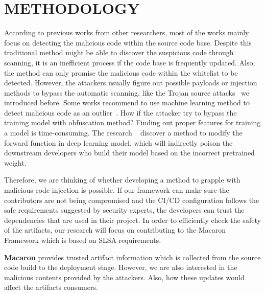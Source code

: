 \section{METHODOLOGY}
According to previous works from other researchers, most of the works mainly focus on detecting the malicious
code within the source code base. Despite this traditional method might be able to discover the suspicious 
code through scanning, it is an inefficient process if the code base is frequently updated. Also, the method 
can only promise the malicious code within the whitelist to be detected. However, the attackers usually 
figure out possible payloads or injection methods to bypass the automatic scanning, like the Trojan source 
attacks~\cite{boucher2023trojan} we introduced before. 
Some works recommend to use machine learning method to detect malicious code as an outlier~\cite{garrett2019detecting}.
How if the attacker try to bypass the training model with obfuscation method? Finding out proper features for
training a model is time-consuming. The research ~\cite{zheng2023careful} discover a method to modify
the forward function in deep learning model, which will indirectly poison the downstream developers who build 
their model based on the incorrect pretrained weight. 

Therefore, we are thinking of whether developing a method to grapple with malicious code injection is possible.
If our framework can make sure the contributors are not being compromised and the CI/CD configuration follows
the safe requirements suggested by security experts, the developers can trust the dependencies that are
used in their project. 
In order to efficiently check the safety of the artifacts, our research will focus on contributing to the Macaron
Framework which is based on SLSA requirements.

\textbf{Macaron} provides trusted artifact information which is collected from the source code build to the deployment stage. However, we
are also interested in the malicious contents provided by the attackers. Also, how these updates would affect the 
artifacts consumers.     

